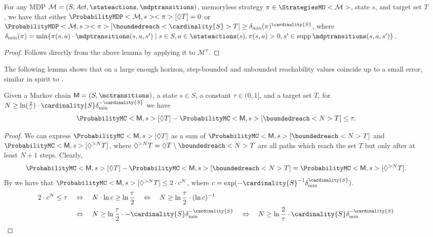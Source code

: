 \documentclass{theoretics}
\newcommand{\MC}{\mathsf{M}}
\newcommand{\MDP}{\mathcal{M}}
\newcommand{\States}{S}
\newcommand{\Actions}{Act}
\newcommand{\strategy}{\pi}
\DeclareMathOperator{\support}{supp}
\newcommand{\reach}{\Diamond}
\newcommand{\targetset}{T}
\begin{document}
\begin{corollary} \label{stm:mdp_minimum_reachability}
	For any MDP $\MDP = (\States,  \Actions, \stateactions, \mdptransitions)$, memoryless strategy $\strategy \in \StrategiesMD<\MDP>$, state $s$, and target set $\targetset$, we have that either $\ProbabilityMDP<\MDP, s><\strategy>[\reach \targetset] = 0$ or $\ProbabilityMDP<\MDP, s><\strategy>[\boundedreach<\cardinality{\States}> \targetset] \geq \delta_{\min}(\strategy)^{\cardinality{\States}}$, where $\delta_{\min}(\strategy) = \min \{ \strategy(s, a) \cdot \mdptransitions(s, a, s') \mid s \in \States, a \in \stateactions(s), \strategy(s, a) > 0, s' \in \support \mdptransitions(s, a, s') \}$.
\end{corollary}
\begin{proof}
	Follows directly from the above lemma by applying it to $\MDP^\strategy$. 
\end{proof}
The following lemma shows that on a large enough horizon, step-bounded and unbounded reachability values coincide up to a small error, similar in spirit to \cite[Lemma~2]{DBLP:journals/ml/KearnsS02}.
\begin{lemma} \label{stm:markov_chain_finite_reach_bound}
	Given a Markov chain $\MC = (\States, \mctransitions)$, a state $s \in \States$, a constant $\tau \in (0, 1]$, and a target set $\targetset$, for $N \geq \ln(\frac{2}{\tau}) \cdot \cardinality{\States} \delta_{\min}^{-\cardinality{\States}}$ we have
	\begin{equation*}
		\ProbabilityMC<\MC, s>[\reach \targetset] - \ProbabilityMC<\MC, s>[\boundedreach<N> \targetset] \leq \tau.
	\end{equation*}
\end{lemma}

\begin{proof}
	We can express $\ProbabilityMC<\MC, s>[\reach \targetset]$ as a sum of $\ProbabilityMC<\MC, s>[\boundedreach<N> \targetset]$ and $\ProbabilityMC<\MC, s>[\reach^{> N} \targetset]$, where $\reach^{> N} \targetset = \reach \targetset \setminus \boundedreach<N> \targetset$ are all paths which reach the set $\targetset$ but only after at least $N + 1$ steps.
	Clearly,
	\begin{equation*}
		\ProbabilityMC<\MC, s>[\reach \targetset] - \ProbabilityMC<\MC, s>[\boundedreach<N> \targetset] = \ProbabilityMC<\MC, s>[\reach^{> N} \targetset].
	\end{equation*}
	By \cite[Lemma~5.1]{DBLP:journals/jacm/BrazdilKK14} we have that $\ProbabilityMC<\MC, s>[\reach^{> N} \targetset] \leq 2 \cdot c^N$, where $c = \exp(-\cardinality{\States}^{-1} \delta_{\min}^{\cardinality{\States}})$.
	\begin{align*}
		2 \cdot c^N \leq \tau \quad & \Leftrightarrow \quad N \cdot \ln c \geq \ln \frac{\tau}{2} \quad \Leftrightarrow \quad N \geq \ln \frac{\tau}{2} \cdot (\ln c)^{-1} \\
			& \Leftrightarrow \quad N \geq \ln \frac{\tau}{2} \cdot - \cardinality{\States} \delta_{\min}^{-\cardinality{\States}} \quad \Leftrightarrow \quad N \geq \ln \frac{2}{\tau} \cdot  \cardinality{\States} \delta_{\min}^{-\cardinality{\States}} \qedhere
	\end{align*}
\end{proof}
\end{document}
